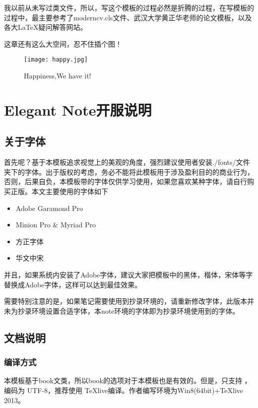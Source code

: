 \documentclass[cyan]{elegantnote}
\begin{document}
我以前从未写过类文件，所以，写这个模板的过程必然是折腾的过程，在写模板的过程中，最主要参考了moderncv.cls文件、武汉大学黄正华老师的论文模板，以及
各大\LaTeX{}疑问解答网站。

{\color{thid}这章还有这么大空间，忍不住插个图！}

\begin{figure}[!hbtp]

		\centering
		\texttt{[image: happy.jpg]}
		\caption{Happiness,We have it!\label{figur:happy}}


\end{figure}

\chapter{Elegant Note开服说明}

\section{关于字体}

首先呢？基于本模板追求视觉上的美观的角度，强烈建议使用者安装./fonts/文件夹下的字体。出于版权的考虑，务必不能将此模板用于涉及盈利目的的商业行为，否则，后果自负，本模板带的字体仅供学习使用，如果您喜欢某种字体，请自行购买正版。本文主要使用的字体如下
\begin{itemize}
\itemsep=3pt
\parskip=0pt
\item Adobe Garamond Pro
\item Minion Pro \& Myriad Pro
\item 方正字体
\item 华文中宋
\end{itemize}

并且，如果系统内安装了Adobe字体，建议大家把模板中的黑体，楷体，宋体等字替换成Adobe字体，这样可以达到最佳效果。

\begin{note}
需要特别注意的是，如果笔记需要使用到抄录环境的，请重新修改字体，此版本并未为抄录环境设置合适字体，本note环境的字体即为抄录环境使用到的字体。
\end{note}

\section{文档说明}
\subsection{编译方式}
本模板基于book文类，所以book的选项对于本模板也是有效的。但是，只支持 \XeLaTeX{}，编码为 UTF-8，推荐使用 \TeX{}live编译。作者编写环境为Win8(64bit)+\TeX{}live 2013。
\end{document}
